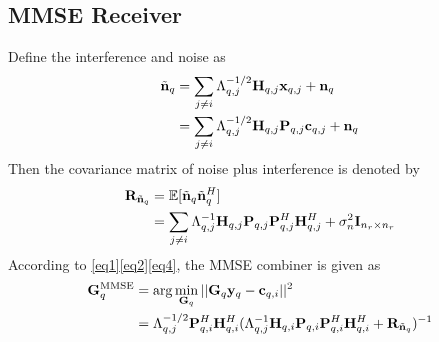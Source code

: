 \documentclass[10pt,conference]{IEEEtran}
\begin{document}
\subsection{MMSE Receiver}
Define the interference and noise as
\begin{equation}
    \begin{split}
        \tilde{{\bf{n}}}_{q} & = \sum_{j \neq i} \Lambda_{q,j}^{-1/2} {\bf{H}}_{q,j} {\bf{x}}_{q,j} + {\bf{n}}_{q} \\
        & = \sum_{j \neq i} \Lambda_{q,j}^{-1/2} {\bf{H}}_{q,j} {\bf{P}}_{q,j} {\bf{c}}_{q,j} + {\bf{n}}_{q} \label{eq3}
    \end{split}
\end{equation}
Then the covariance matrix of noise plus interference is denoted by
\begin{equation}
    \begin{split}
        {\bf{R}}_{\tilde{{\bf{n}}}_{q}} & = \mathbb{E}[\tilde{{\bf{n}}}_{q} \tilde{{\bf{n}}}_{q}^H]\\
        & = \sum_{j \neq i} \Lambda_{q,j}^{-1} {\bf{H}}_{q,j} {\bf{P}}_{q,j} {\bf{P}}_{q,j}^H {\bf{H}}_{q,j}^H + \sigma_n^2 {\bf{I}}_{n_r \times n_r}\label{eq4}
    \end{split}
\end{equation}
According to \eqref{eq1}\eqref{eq2}\eqref{eq4}, the MMSE combiner is given as
\begin{equation}
    \begin{split}
        {\bf{G}}_q^{\text{MMSE}} & = \arg \min_{{\bf{G}}_q} ||{\bf{G}}_q {\bf{y}}_q - {\bf{c}}_{q,i}||^2\\
        & = \Lambda_{q,j}^{-1/2} {\bf{P}}_{q,i}^H {\bf{H}}_{q,i}^H (\Lambda_{q,j}^{-1} {\bf{H}}_{q,i} {\bf{P}}_{q,i} {\bf{P}}_{q,i}^H {\bf{H}}_{q,i}^H + {\bf{R}}_{\tilde{{\bf{n}}}_{q}})^{-1} \label{eq5}
    \end{split}
\end{equation}
\end{document}
